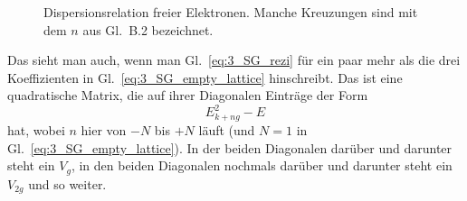 \begin{figure}
   \caption{Dispersionsrelation freier Elektronen. Manche Kreuzungen sind mit dem $n$ aus 
   Gl.~B.2 bezeichnet. 
   }
\end{figure}

Das sieht man auch, wenn man  Gl.~\ref{eq:3_SG_rezi} für ein paar mehr als die drei Koeffizienten in Gl.~\ref{eq:3_SG_empty_lattice}  hinschreibt. Das ist eine quadratische Matrix, die auf ihrer Diagonalen Einträge der Form
\begin{equation}
    E_{k + ng}^2 - E
\end{equation}
hat, wobei $n$ hier von $-N$ bis $+N$ läuft (und $N=1$ in  Gl.~\ref{eq:3_SG_empty_lattice}).
In der beiden Diagonalen darüber und darunter steht ein $V_g$, in den beiden Diagonalen nochmals darüber und darunter steht ein $V_{2g}$ und so weiter. 






